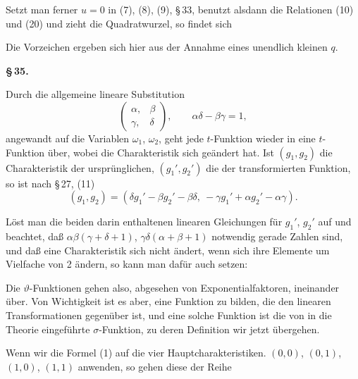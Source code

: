 Setzt man ferner $u = 0$ in (7), (8), (9), \S\,33, benutzt alsdann die Relationen (10) und (20) und zieht die Quadratwurzel, so findet sich


Die Vorzeichen ergeben sich hier aus der Annahme eines unendlich kleinen $q$.

\begin{center}
\textbf{\S\,35. }
\end{center}

Durch die allgemeine lineare Substitution
\[
\begin{pmatrix} \alpha, & \beta \\ \gamma, & \delta \end{pmatrix}, \qquad \alpha\delta - \beta\gamma = 1,
\]
angewandt auf die Variablen $\omega_1$, $\omega_2$, geht jede $t$-Funktion wieder in eine $t$-Funktion über, wobei die Charakteristik sich geändert hat. Ist $(g_1, g_2)$ die Charakteristik der ursprünglichen, $(g_1', g_2')$ die der transformierten Funktion, so ist nach \S\,27, (11)
\[
(g_1, g_2) = (\delta g_1' - \beta g_2' - \beta\delta,\ -\gamma g_1' + \alpha g_2' - \alpha\gamma).
\]

Löst man die beiden darin enthaltenen linearen Gleichungen für $g_1'$, $g_2'$ auf und beachtet, daß $\alpha\beta(\gamma+\delta+1)$, $\gamma\delta(\alpha+\beta+1)$ notwendig gerade Zahlen sind, und daß eine Charakteristik sich nicht ändert, wenn sich ihre Elemente um Vielfache von 2 ändern, so kann man dafür auch setzen:


Die $\vartheta$-Funktionen gehen also, abgesehen von Exponentialfaktoren, ineinander über. Von Wichtigkeit ist es aber, eine Funktion zu bilden, die den linearen Transformationen gegenüber  ist, und eine solche Funktion ist die von  in die Theorie eingeführte $\sigma$-Funktion, zu deren Definition wir jetzt übergehen.

Wenn wir die Formel (1) auf die vier Hauptcharakteristiken. $(0, 0)$, $(0, 1)$, $(1, 0)$, $(1, 1)$ anwenden, so gehen diese der Reihe
